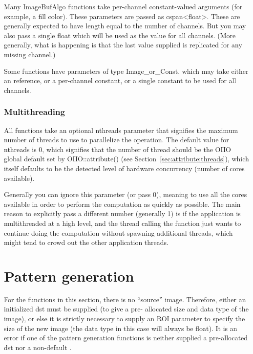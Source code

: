 Many ImageBufAlgo functions take per-channel constant-valued arguments
(for example, a fill color). These parameters are passed as
{\cf cspan<float>}. These are generally expected to have length equal to the
number of channels. But you may also pass a single float which will be
used as the value for all channels. (More generally, what is happening
is that the last value supplied is replicated for any missing channel.)

Some \ImageBufAlgo functions have parameters of type {\cf Image_or_Const},
which may take either an \ImageBuf reference, or a per-channel constant,
or a single constant to be used for all channels.

\subsubsection*{Multithreading}

All \IBA functions take an optional {\cf nthreads} parameter that
signifies the maximum number of threads to use to parallelize the
operation.  The default value for {\cf nthreads} is 0, which signifies
that the number of thread should be the OIIO global default set by {\cf
  OIIO::attribute()} (see Section~\ref{sec:attribute:threads}), which
itself defaults to be the detected level of hardware concurrency (number
of cores available).

Generally you can ignore this parameter (or pass 0), meaning to use all
the cores available in order to perform the computation as quickly as
possible.  The main reason to explicitly pass a different number
(generally 1) is if the application is multithreaded at a high level,
and the thread calling the \IBA function just wants to continue doing
the computation without spawning additional threads, which might tend to
crowd out the other application threads.


\newpage

\section{Pattern generation}
\label{sec:iba:patterns}

For the \IBA functions in this section, there is no ``source'' image.
Therefore, either an initialized {\cf dst} must be supplied (to give a pre-
allocated size and data type of the image), or else it is strictly necessary
to supply an ROI parameter to specify the size of the new image (the data
type in this case will always be {\cf float}). It is an error if one of the
pattern generation \IBA functions is neither supplied a pre-allocated {\cf
dst} nor a non-default \ROI.

